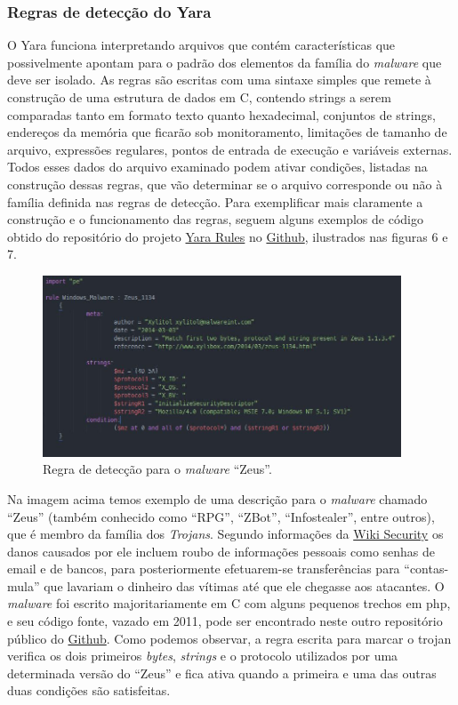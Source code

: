 \subsubsection{Regras de detecção do Yara}
\label{l.regrasdyara}
O Yara funciona interpretando arquivos que contém características que possivelmente
apontam para o padrão dos elementos da família do \textit{malware} que deve ser
isolado. As regras são escritas com uma sintaxe simples que remete à
construção de uma estrutura de dados em C, contendo strings a serem comparadas
tanto em formato texto quanto hexadecimal, conjuntos de strings, endereços da
memória que ficarão sob monitoramento, limitações de tamanho de arquivo,
expressões regulares, pontos de entrada de execução e variáveis externas.
Todos esses dados do arquivo examinado podem ativar condições, listadas na
construção dessas regras, que vão determinar se o arquivo corresponde ou não à
família definida nas regras de detecção. Para exemplificar mais claramente a
construção e o funcionamento das regras, seguem alguns exemplos de código
obtido do repositório do projeto \href{yararules.org}{Yara Rules} no
\href{github.com}{Github}, ilustrados nas figuras 6 e 7.

\begin{figure}[H]
	\centering
	\includegraphics[width=0.95\textwidth]{figs/zeus}
	\caption{Regra de detecção para o \textit{malware} ``Zeus''.}
	\label{f.regrazeus}
\end{figure}

Na imagem acima temos exemplo de uma descrição para o \textit{malware} chamado
``Zeus'' (também conhecido como ``RPG'', ``ZBot'', ``Infostealer'', entre
outros), que é membro da família dos \textit{Trojans}. Segundo informações da
\href{www.wiki-security.com}{Wiki Security}\citeyear{wikisecurity} os danos
causados por ele incluem roubo de informações pessoais como senhas de email e de
bancos, para posteriormente efetuarem-se transferências para ``contas-mula'' que
lavariam o dinheiro das vítimas até que ele chegasse aos atacantes. O
\textit{malware} foi escrito majoritariamente em C com alguns pequenos trechos
em php, e seu código fonte, vazado em 2011, pode ser encontrado neste outro
repositório público do \href{https://github.com/Visgean/Zeus}{Github}. Como
podemos observar, a regra escrita para marcar o trojan verifica os dois
primeiros \textit{bytes}, \textit{strings} e o protocolo utilizados por uma
determinada versão do ``Zeus'' e fica ativa quando a primeira e uma das outras
duas condições são satisfeitas.

